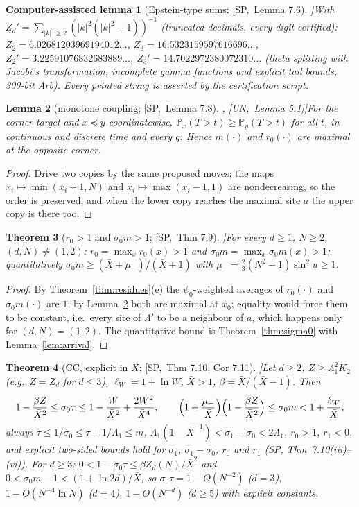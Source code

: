 \documentclass[10pt,a4paper]{article}
\theoremstyle{plain}
\newtheorem{theorem}{Theorem}[section]
\newtheorem{lemma}[theorem]{Lemma}
\newtheorem{calemma}[theorem]{Computer-assisted lemma}
\theoremstyle{definition}
\newcommand{\src}[2]{[\textsf{#1},~#2]}           %
\newcommand{\SPE}{\textsf{SP}}
\newcommand{\UNI}{\textsf{UN}}
\renewcommand{\P}{\mathbb{P}}
\newcommand{\Xb}{\bar X}
\begin{document}
\begin{calemma}[Epstein-type sums; \src{\SPE}{Lemma 7.6}]\label{lem:epstein}
With $Z_d'=\sum_{|k|^2\ge2}(|k|^2(|k|^2-1))^{-1}$ (truncated decimals, every digit certified):
$Z_2=6.02681203969194012\ldots$, $Z_3=16.5323159597616696\ldots$, $Z_2'=3.22591076832683889\ldots$, $Z_3'=14.7022972380072310\ldots$
(theta splitting with Jacobi's transformation, incomplete gamma functions and explicit tail bounds, 300-bit Arb). Every printed string is asserted by the certification script.
\end{calemma}

\begin{lemma}[monotone coupling; \src{\SPE}{Lemma 7.8}, \src{\UNI}{Lemma 5.1}]\label{lem:coupling}
For the corner target and $x\preceq y$ coordinatewise, $\P_x(T>t)\ge\P_y(T>t)$ for all $t$, in continuous and discrete time and every $q$. Hence $m(\cdot)$ and $r_0(\cdot)$ are maximal at the opposite corner.
\end{lemma}
\begin{proof}
Drive two copies by the same proposed moves; the maps $x_i\mapsto\min(x_i+1,N)$ and $x_i\mapsto\max(x_i-1,1)$ are nondecreasing, so the order is preserved, and when the lower copy reaches the maximal site $a$ the upper copy is there too.
\end{proof}

\begin{theorem}[$r_0>1$ and $\sigma_0m>1$; \src{\SPE}{Thm 7.9}]\label{thm:r0}
For every $d\ge1$, $N\ge2$, $(d,N)\ne(1,2)$: $r_0=\max_xr_0(x)>1$ and $\sigma_0m=\max_x\sigma_0m(x)>1$; quantitatively $\sigma_0m\ge(\Xb+\mu_-)/(\Xb+1)$ with $\mu_-=\frac23(N^2-1)\sin^2u\ge1$.
\end{theorem}
\begin{proof}
By Theorem~\ref{thm:residues}(e) the $\psi_0$-weighted averages of $r_0(\cdot)$ and $\sigma_0m(\cdot)$ are $1$; by Lemma~\ref{lem:coupling} both are maximal at $x_0$; equality would force them to be constant, i.e.\ every site of $\Lambda'$ to be a neighbour of $a$, which happens only for $(d,N)=(1,2)$. The quantitative bound is Theorem~\ref{thm:sigma0} with Lemma~\ref{lem:arrival}.
\end{proof}

\begin{theorem}[CC, explicit in $\Xb$; \src{\SPE}{Thm 7.10, Cor 7.11}]\label{thm:cc-any-d}
Let $d\ge2$, $Z\ge\Lambda_1^2K_2$ (e.g.\ $Z=Z_d$ for $d\le3$), $\ell_W=1+\ln W$, $\Xb>1$, $\beta=\Xb/(\Xb-1)$. Then
\[
1-\frac{\beta Z}{\Xb^2}\le\sigma_0\tau\le1-\frac W{\Xb^2}+\frac{2W^2}{\Xb^4},\qquad
\Bigl(1+\frac{\mu_-}{\Xb}\Bigr)\Bigl(1-\frac{\beta Z}{\Xb^2}\Bigr)\le\sigma_0m<1+\frac{\ell_W}{\Xb},
\]
always $\tau\le1/\sigma_0\le\tau+1/\Lambda_1\le m$, $\Lambda_1(1-\Xb^{-1})<\sigma_1-\sigma_0<2\Lambda_1$, $r_0>1$, $r_1<0$, and explicit two-sided bounds hold for $\sigma_1$, $\sigma_1-\sigma_0$, $r_0$ and $r_1$ (\SPE, Thm~7.10(iii)--(vi)). For $d\ge3$: $0<1-\sigma_0\tau\le\beta Z_d(N)/\Xb^2$ and $0<\sigma_0m-1<(1+\ln2d)/\Xb$, so $\sigma_0\tau=1-O(N^{-2})$ ($d=3$), $1-O(N^{-4}\ln N)$ ($d=4$), $1-O(N^{-d})$ ($d\ge5$) with explicit constants.
\end{theorem}
\end{document}
